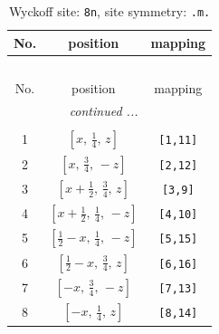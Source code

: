 \documentclass[fleqn,8pt]{jsarticle}
\begin{document}
\begin{longtable}{ccc}
\caption{Wyckoff site: {\tt 8n}, site symmetry: {\tt .m.}}
 \\
 \hline \hline
No. & position & mapping \\ \hline \endfirsthead

\multicolumn{2}{l}{\tablename\ \thetable{}} \\
 \hline \hline
No. & position & mapping \\ \hline \endhead

 \hline \hline
\multicolumn{2}{r}{\footnotesize\it continued ...} \\ \endfoot

 \hline \hline
\multicolumn{2}{r}{} \\ \endlastfoot

1 & $\left[ x,\, \frac{1}{4},\, z \right]$ & {\tt [1,11]} \\ \hline
2 & $\left[ x,\, \frac{3}{4},\, - z \right]$ & {\tt [2,12]} \\ \hline
3 & $\left[ x + \frac{1}{2},\, \frac{3}{4},\, z \right]$ & {\tt [3,9]} \\ \hline
4 & $\left[ x + \frac{1}{2},\, \frac{1}{4},\, - z \right]$ & {\tt [4,10]} \\ \hline
5 & $\left[ \frac{1}{2} - x,\, \frac{1}{4},\, - z \right]$ & {\tt [5,15]} \\ \hline
6 & $\left[ \frac{1}{2} - x,\, \frac{3}{4},\, z \right]$ & {\tt [6,16]} \\ \hline
7 & $\left[ - x,\, \frac{3}{4},\, - z \right]$ & {\tt [7,13]} \\ \hline
8 & $\left[ - x,\, \frac{1}{4},\, z \right]$ & {\tt [8,14]} \\
\end{longtable}
\renewcommand{\arraystretch}{1.2}
\end{document}
